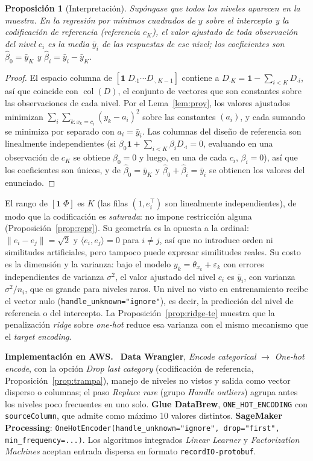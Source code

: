 \documentclass[11pt,a4paper]{article}
\theoremstyle{plain}
\newtheorem{proposicion}[teorema]{Proposición}
\theoremstyle{definition}
\theoremstyle{remark}
\newcommand{\col}{\operatorname{col}}
\newcommand{\1}{\mathbf{1}}
\newenvironment{aws}{\par\medskip\sloppy\noindent\textbf{Implementación en AWS.}\ }{\par\medskip}
\begin{document}
\begin{proposicion}[Interpretación]\label{prop:onehot}
Supóngase que todos los niveles aparecen en la muestra. En la regresión por
mínimos cuadrados de $y$ sobre el intercepto y la codificación de
referencia (referencia $c_K$), el valor ajustado de toda observación del
nivel $c_i$ es la media $\bar y_i$ de las respuestas de ese nivel; los
coeficientes son $\hat\beta_0=\bar y_K$ y $\hat\beta_i=\bar y_i-\bar y_K$.
\end{proposicion}

\begin{proof}
El espacio columna de $[\1\;D_{\cdot1}\cdots D_{\cdot,K-1}]$ contiene a
$D_{\cdot K}=\1-\sum_{i<K}D_{\cdot i}$, así que coincide con $\col(D)$, el
conjunto de vectores que son constantes sobre las observaciones de cada
nivel. Por el Lema~\ref{lem:proy}, los valores ajustados minimizan
$\sum_i\sum_{k:x_k=c_i}(y_k-a_i)^2$ sobre las constantes $(a_i)$, y cada
sumando se minimiza por separado con $a_i=\bar y_i$. Las columnas del
diseño de referencia son linealmente independientes (si
$\beta_0\1+\sum_{i<K}\beta_iD_{\cdot i}=0$, evaluando en una observación de
$c_K$ se obtiene $\beta_0=0$ y luego, en una de cada $c_i$, $\beta_i=0$),
así que los coeficientes son únicos, y de $\hat\beta_0=\bar y_K$ y
$\hat\beta_0+\hat\beta_i=\bar y_i$ se obtienen los valores del enunciado.
\end{proof}

El rango de $[\1\;\Phi]$ es $K$ (las filas $(1,e_i^\top)$ son linealmente
independientes), de modo que la codificación es \emph{saturada}: no impone
restricción alguna (Proposición~\ref{prop:repr}). Su geometría es la
opuesta a la ordinal: $\|e_i-e_j\|=\sqrt2$ y $\langle e_i,e_j\rangle=0$
para $i\ne j$, así que no introduce orden ni similitudes artificiales,
pero tampoco puede expresar similitudes reales. Su costo es la dimensión y
la varianza: bajo el modelo $y_k=\theta_{x_k}+\varepsilon_k$ con errores
independientes de varianza $\sigma^2$, el valor ajustado del nivel $c_i$
es $\bar y_i$, con varianza $\sigma^2/n_i$, que es grande para niveles
raros. Un nivel no visto en entrenamiento recibe el vector nulo
(\texttt{handle\_unknown="ignore"}), es decir, la predicción del nivel de
referencia o del intercepto. La Proposición~\ref{prop:ridge-te} muestra que
la penalización \emph{ridge} sobre \emph{one-hot} reduce esa varianza con
el mismo mecanismo que el \emph{target encoding}.

\begin{aws}
\textbf{Data Wrangler}, \emph{Encode categorical} $\to$ \emph{One-hot
encode}, con la opción \emph{Drop last category} (codificación de
referencia, Proposición~\ref{prop:trampa}), manejo de niveles no vistos y
salida como vector disperso o columnas; el paso \emph{Replace rare}
(grupo \emph{Handle outliers}) agrupa antes los niveles poco frecuentes en
uno solo. \textbf{Glue DataBrew}, \texttt{ONE\_HOT\_ENCODING} con
\texttt{sourceColumn}, que admite como máximo 10 valores distintos.
\textbf{SageMaker Processing}: \texttt{OneHotEncoder(handle\_unknown="ignore",
drop="first", min\_frequency=...)}. Los algoritmos integrados
\emph{Linear Learner} y \emph{Factorization Machines} aceptan entrada
dispersa en formato \texttt{recordIO-protobuf}.
\end{aws}
\end{document}

